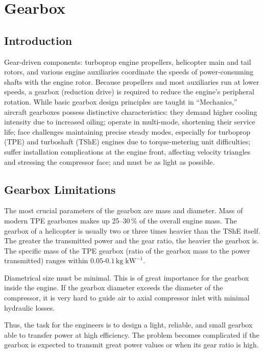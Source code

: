 \chapter{Gearbox}
\section{Introduction}
    Gear-driven components: turboprop engine propellers, helicopter main and tail rotors, and various engine 
    auxiliaries coordinate the speeds of power-consuming shafts with the engine rotor. Because propellers and 
    most auxiliaries run at lower speeds, a gearbox (reduction drive) is required to reduce the engine's peripheral 
    rotation. While basic gearbox design principles are taught in “Mechanics,” aircraft gearboxes possess 
    distinctive characteristics: they demand higher cooling intensity due to increased oiling; operate in 
    multi-mode, shortening their service life; face challenges maintaining precise steady modes, especially 
    for turboprop (TPE) and turboshaft (TShE) engines due to torque-metering unit difficulties; suffer 
    installation complications at the engine front, affecting velocity triangles and stressing the compressor 
    face; and must be as light as possible.

\section{Gearbox Limitations}
    The most crucial parameters of the gearbox are mass and diameter. Mass of modern TPE gearboxes makes up 
    25--30\,\% of the overall engine mass. The gearbox of a helicopter is usually two or three times heavier 
    than the TShE itself. The greater the transmitted power and the gear ratio, the heavier the gearbox is. 
    The specific mass of the TPE gearbox (ratio of the gearbox mass to the power transmitted) ranges 
    within \(0.05\text{-}0.1\,\mathrm{kg}\;\mathrm{kW}^{-1}\).

    Diametrical size must be minimal. This is of great importance for the gearbox inside the engine. 
    If the gearbox diameter exceeds the diameter of the compressor, it is very hard to guide air to axial 
    compressor inlet with minimal hydraulic losses.

    Thus, the task for the engineers is to design a light, reliable, and small gearbox able to transfer power 
    at high efficiency. The problem becomes complicated if the gearbox is expected to transmit great power 
    values or when its gear ratio is high.

